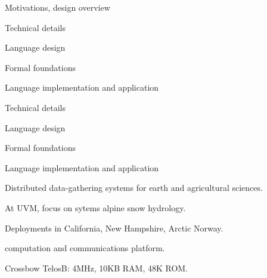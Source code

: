 
\begin{cenumerate}
\item Motivations, design overview
\item Technical details
\begin{citemize}
\item Language design 
\item Formal foundations
\end{citemize}
\item Language implementation and application
\end{cenumerate}

\stopslide


\begin{cenumerate}
\item {}
\item Technical details
\begin{citemize}
\item Language design 
\item Formal foundations
\end{citemize}
\item Language implementation and application
\end{cenumerate}

\stopslide



\begin{citemize}
\item Distributed data-gathering systems for earth and agricultural sciences.
\item At UVM, focus on sytems alpine snow hydrology.
\begin{citemize}
\item Deployments in California, New Hampshire, Arctic Norway.
\end{citemize}
\end{citemize}
\stopslide


\begin{center}
\end{center}

\begin{citemize}
\item {} computation and communications platform.
\item Crossbow TelosB: 4MHz, 10KB RAM, 48K ROM.
\end{citemize}
\stopslide

